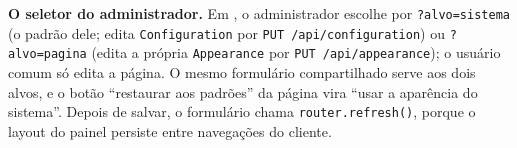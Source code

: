 \textbf{O seletor do administrador.} Em , o administrador escolhe por \texttt{?alvo=sistema} (o padrão dele; edita \texttt{Configuration} por \texttt{PUT /api/configuration}) ou \texttt{?alvo=pagina} (edita a própria \texttt{Appearance} por \texttt{PUT /api/appearance}); o usuário comum só edita a página. O mesmo formulário compartilhado serve aos dois alvos, e o botão ``restaurar aos padrões'' da página vira ``usar a aparência do sistema''. Depois de salvar, o formulário chama \texttt{router.refresh()}, porque o layout do painel persiste entre navegações do cliente.
